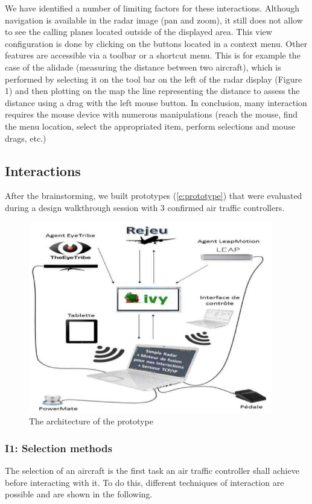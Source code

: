 We have identified a number of limiting factors for these
interactions. Although navigation is available in the radar
image (pan and zoom), it still does not allow to see the
calling planes located outside of the displayed area. This
view configuration is done by clicking on the buttons located
in a context menu. Other features are accessible via a toolbar
or a shortcut menu. This is for example the case of the
alidade (measuring the distance between two aircraft), which
is performed by selecting it on the tool bar on the left of the
radar display (Figure 1) and then plotting on the map the line
representing the distance to assess the distance using a drag
with the left mouse button.
In conclusion, many interaction requires the mouse device with
numerous manipulations (reach the mouse, find the menu
location, select the appropriated item, perform selections and mouse drags, etc.)

\subsection{Interactions}
After the brainstorming, we built prototypes (\autoref{e:prototype}) that were
evaluated during a design walkthrough session with 3
confirmed air traffic controllers.

 \begin{figure}
 \centering
	\includegraphics[width=0.95\textwidth]{Figures/prototype.png}
	\caption{ The architecture of the prototype}
	\label{e:prototype}
\end{figure}

\subsubsection{I1: Selection methods}
The selection of an aircraft is the first task an air traffic
controller shall achieve before interacting with it. To do this, different techniques of
interaction are possible and are shown in the following.

